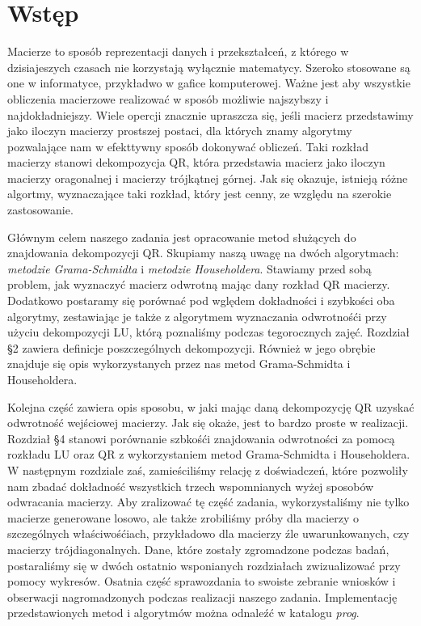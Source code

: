 \section{Wstęp}
Macierze to sposób reprezentacji danych i przekształceń, z którego w dzisiajeszych
czasach nie korzystają wyłącznie matematycy. Szeroko stosowane są one
w informatyce, przykładwo w gafice komputerowej. Ważne jest aby wszystkie
obliczenia macierzowe realizować w sposób możliwie najszybszy i najdokładniejszy.
Wiele opercji znacznie upraszcza się, jeśli macierz przedstawimy jako
iloczyn macierzy prostszej postaci, dla których znamy algorytmy pozwalające
nam w efekttywny sposób dokonywać obliczeń. Taki rozkład macierzy stanowi
dekompozycja QR, która przedstawia macierz jako iloczyn macierzy oragonalnej
i macierzy trójkątnej górnej. Jak się okazuje, istnieją różne algortmy,
wyznaczające taki rozkład, który jest cenny, ze względu na szerokie zastosowanie.

Głównym celem naszego zadania jest opracowanie metod służących do
znajdowania dekompozycji QR. Skupiamy naszą uwagę na dwóch algorytmach: \textit{metodzie Grama-Schmidta}
i \textit{metodzie Householdera}. Stawiamy przed sobą problem, jak wyznaczyć
macierz odwrotną mając dany rozkład QR macierzy. Dodatkowo postaramy się
porównać pod wględem dokładności i szybkości oba algorytmy,
zestawiając je także z algorytmem wyznaczania odwrotnośći przy użyciu
dekompozycji LU, którą poznaliśmy podczas tegorocznych zajęć.
Rozdział \S2 zawiera definicje poszczególnych dekompozycji. Również w jego
obrębie znajduje się opis wykorzystanych przez nas metod Grama-Schmidta i Householdera.

Kolejna część zawiera opis sposobu, w jaki mając daną dekompozycję QR
uzyskać odwrotność wejściowej macierzy. Jak się okaże, jest to bardzo proste
w realizacji. Rozdział \S4 stanowi porównanie szbkośći znajdowania
odwrotności za pomocą rozkładu LU oraz QR z wykorzystaniem metod
Grama-Schmidta i Householdera. W następnym rozdziale zaś, zamieściliśmy
relację z doświadczeń, które pozwoliły nam zbadać dokładność wszystkich
trzech wspomnianych wyżej sposobów odwracania macierzy. Aby zralizować
tę część zadania, wykorzystaliśmy nie tylko macierze generowane losowo, ale
także zrobiliśmy próby dla macierzy o szczególnych właściwośćiach,
przykładowo dla macierzy źle uwarunkowanych, czy macierzy trójdiagonalnych.
Dane, które zostały zgromadzone podczas badań, postaraliśmy się
w dwóch ostatnio wsponianych rozdziałach zwizualizować przy pomocy wykresów.
Osatnia część sprawozdania to swoiste zebranie wniosków i obserwacji
nagromadzonych podczas realizacji naszego zadania.
Implementację przedstawionych metod i algorytmów można odnaleźć w katalogu \textit{prog}.



